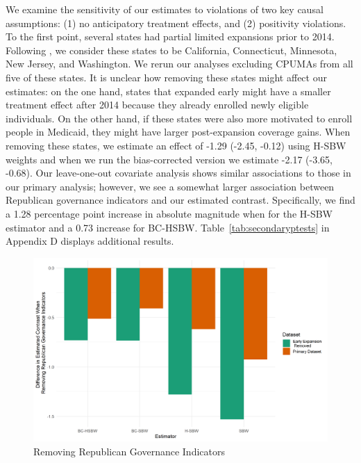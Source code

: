 \documentclass[12pt]{article}
\begin{document}
We examine the sensitivity of our estimates to violations of two key causal assumptions: (1) no anticipatory treatment effects, and (2) positivity violations. To the first point, several states had partial limited expansions prior to 2014. Following \cite{frean2017premium}, we consider these states to be California, Connecticut, Minnesota, New Jersey, and Washington. We rerun our analyses excluding CPUMAs from all five of these states. It is unclear how removing these states might affect our estimates: on the one hand, states that expanded early might have a smaller treatment effect after 2014 because they already enrolled newly eligible individuals. On the other hand, if these states were also more motivated to enroll people in Medicaid, they might have larger post-expansion coverage gains. When removing these states, we estimate an effect of -1.29 (-2.45, -0.12) using H-SBW weights and when we run the bias-corrected version we estimate -2.17 (-3.65, -0.68). Our leave-one-out covariate analysis shows similar associations to those in our primary analysis; however, we see a somewhat larger association between Republican governance indicators and our estimated contrast. Specifically, we find a 1.28 percentage point increase in absolute magnitude when for the H-SBW estimator and a 0.73 increase for BC-HSBW. Table~\ref{tab:secondaryptests} in Appendix D displays additional results. 

\begin{figure}[]
\begin{center}
    \includegraphics[scale=0.6]{01_Plots/repub-diff-c1c2.png}
    \caption{Removing Republican Governance Indicators}
    \label{fig:repub}
\end{center}
\end{figure}
\end{document}
